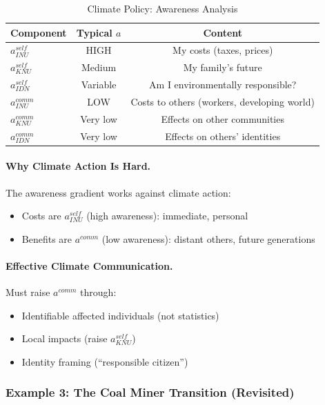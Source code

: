 \begin{table}[htbp]
\centering
\caption{Climate Policy: Awareness Analysis}
\label{tab:climate-awareness}
\renewcommand{\arraystretch}{1.3}
\begin{tabular}{@{}lcc@{}}
\toprule
\textbf{Component} & \textbf{Typical $a$} & \textbf{Content} \\
\midrule
$a^{self}_{INU}$ & HIGH & My costs (taxes, prices) \\
$a^{self}_{KNU}$ & Medium & My family's future \\
$a^{self}_{IDN}$ & Variable & Am I environmentally responsible? \\
$a^{comm}_{INU}$ & LOW & Costs to others (workers, developing world) \\
$a^{comm}_{KNU}$ & Very low & Effects on other communities \\
$a^{comm}_{IDN}$ & Very low & Effects on others' identities \\
\bottomrule
\end{tabular}
\end{table}

\paragraph{Why Climate Action Is Hard.}
The awareness gradient works against climate action:
\begin{itemize}
\item Costs are $a^{self}_{INU}$ (high awareness): immediate, personal
\item Benefits are $a^{comm}$ (low awareness): distant others, future generations
\end{itemize}

\paragraph{Effective Climate Communication.}
Must raise $a^{comm}$ through:
\begin{itemize}
\item Identifiable affected individuals (not statistics)
\item Local impacts (raise $a^{self}_{KNU}$)
\item Identity framing (``responsible citizen'')
\end{itemize}

\subsubsection{Example 3: The Coal Miner Transition (Revisited)}

